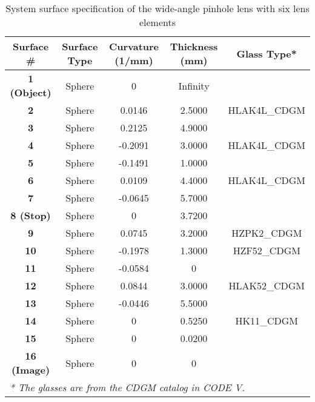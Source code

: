 \begin{table}[h!]
    \centering
    \captionsetup{justification=centering}
    \caption{System surface specification of the wide-angle pinhole lens with six lens elements}
    \label{table: appdx_system_spec_wide_angle_6_lenses}
    \vspace{-1em}
    \begin{adjustbox}{max width=\textwidth, center}
    \begin{tabular}{c c c c c}
    \hline 
     \textbf{Surface \#} & \textbf{Surface Type} & \textbf{Curvature (1/mm)} & \textbf{Thickness (mm)} & \textbf{Glass Type*}  \\ 
     \midrule
    \rowcolor[gray]{0.9}  \textbf{1 (Object)} & Sphere & 0 & Infinity &    \\ 
    										\textbf{2}              & Sphere & 0.0146 & 2.5000 & HLAK4L\_CDGM   \\
   \rowcolor[gray]{0.9}    \textbf{3}               & Sphere & 0.2125 & 4.9000 &  \\
                                            \textbf{4}              & Sphere & -0.2091 & 3.0000 & HLAK4L\_CDGM   \\ 
    \rowcolor[gray]{0.9}   \textbf{5}              & Sphere  & -0.1491  & 1.0000 &  \\
                                           \textbf{6}               & Sphere  & 0.0109 & 4.4000   & HLAK4L\_CDGM \\
    \rowcolor[gray]{0.9}  \textbf{7}                & Sphere & -0.0645 & 5.7000 & \\ 
                                          \textbf{8 (Stop)}    & Sphere  & 0          & 3.7200 &  \\
   \rowcolor[gray]{0.9}  \textbf{9}                & Sphere  & 0.0745  &  3.2000 &  HZPK2\_CDGM   \\
                                          \textbf{10}                & Sphere  & -0.1978& 1.3000 & HZF52\_CDGM \\
   \rowcolor[gray]{0.9}  \textbf{11}                & Sphere & -0.0584 &  0         &      \\
                                          \textbf{12}                & Sphere  & 0.0844 & 3.0000 & HLAK52\_CDGM \\
   \rowcolor[gray]{0.9}  \textbf{13}                & Sphere & -0.0446 &  5.5000 &      \\
                                          \textbf{14}                & Sphere  & 0          & 0.5250 & HK11\_CDGM \\
   \rowcolor[gray]{0.9}  \textbf{15}                & Sphere &  0          &  0.0200 &      \\
                                         \textbf{16 (Image)} & Sphere & 0 & 0 &   \\ 
    \hline
    \multicolumn{5}{l}{\textit{\footnotesize{* The glasses are from the CDGM catalog in CODE V. }}}\\
    \end{tabular}
    \end{adjustbox}
\end{table}
